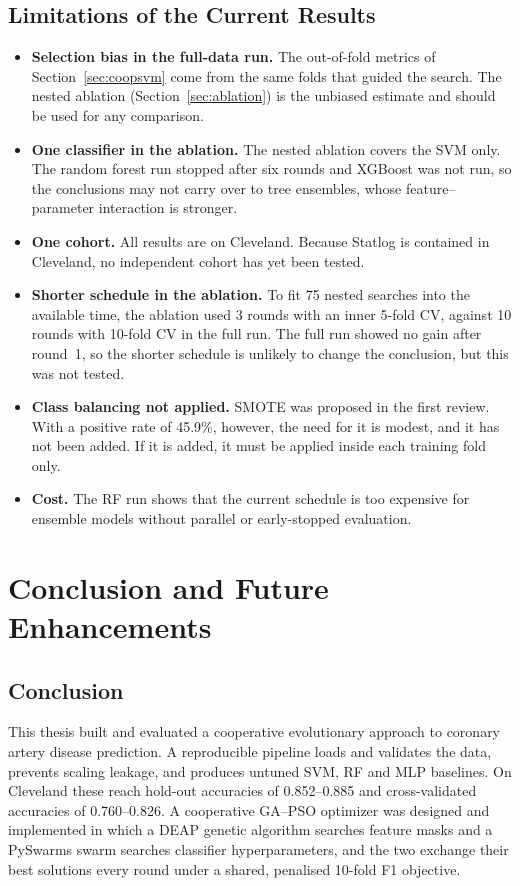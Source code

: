 \documentclass[MTech]{ugthesis}
\begin{document}
\section{Limitations of the Current Results}
\label{sec:limits}
\begin{itemize}
\item \textbf{Selection bias in the full-data run.} The out-of-fold metrics of Section~\ref{sec:coopsvm} come from the same folds that guided the search. The nested ablation (Section~\ref{sec:ablation}) is the unbiased estimate and should be used for any comparison.
\item \textbf{One classifier in the ablation.} The nested ablation covers the SVM only. The random forest run stopped after six rounds and XGBoost was not run, so the conclusions may not carry over to tree ensembles, whose feature--parameter interaction is stronger.
\item \textbf{One cohort.} All results are on Cleveland. Because Statlog is contained in Cleveland, no independent cohort has yet been tested.
\item \textbf{Shorter schedule in the ablation.} To fit 75 nested searches into the available time, the ablation used 3 rounds with an inner 5-fold CV, against 10 rounds with 10-fold CV in the full run. The full run showed no gain after round~1, so the shorter schedule is unlikely to change the conclusion, but this was not tested.
\item \textbf{Class balancing not applied.} SMOTE \citep{chawla2002smote} was proposed in the first review. With a positive rate of 45.9\%, however, the need for it is modest, and it has not been added. If it is added, it must be applied inside each training fold only.
\item \textbf{Cost.} The RF run shows that the current schedule is too expensive for ensemble models without parallel or early-stopped evaluation.
\end{itemize}

\chapter{Conclusion and Future Enhancements}
\label{chap:conclusion}

\section{Conclusion}
This thesis built and evaluated a cooperative evolutionary approach to coronary artery disease prediction. A reproducible pipeline loads and validates the data, prevents scaling leakage, and produces untuned SVM, RF and MLP baselines. On Cleveland these reach hold-out accuracies of 0.852--0.885 and cross-validated accuracies of 0.760--0.826. A cooperative GA--PSO optimizer was designed and implemented in which a DEAP genetic algorithm searches feature masks and a PySwarms swarm searches classifier hyperparameters, and the two exchange their best solutions every round under a shared, penalised 10-fold F1 objective.
\end{document}
